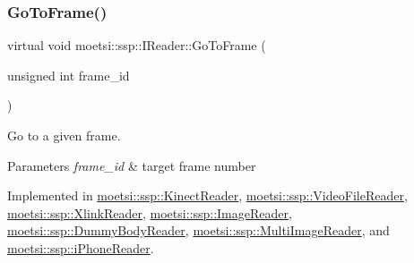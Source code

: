 \mbox{\label{classmoetsi_1_1ssp_1_1IReader_a6f1be3c06538992cca6d550bd9566681}} 
\subsubsection{\texorpdfstring{Go\+To\+Frame()}{GoToFrame()}\hspace{0.1cm}{\footnotesize\ttfamily [1/2]}}
{\footnotesize\ttfamily virtual void moetsi\+::ssp\+::\+I\+Reader\+::\+Go\+To\+Frame (\begin{DoxyParamCaption}\item[{unsigned int}]{frame\+\_\+id }\end{DoxyParamCaption})\hspace{0.3cm}{\ttfamily [pure virtual]}}



Go to a given frame. 


\begin{DoxyParams}{Parameters}
{\em frame\+\_\+id} & target frame number \\
\hline
\end{DoxyParams}


Implemented in \hyperlink{classmoetsi_1_1ssp_1_1KinectReader_a315690c46e153a35d4ded1189e93af08}{moetsi\+::ssp\+::\+Kinect\+Reader}, \hyperlink{classmoetsi_1_1ssp_1_1VideoFileReader_ad98a532db8b1e2c3879df274b2efb082}{moetsi\+::ssp\+::\+Video\+File\+Reader}, \hyperlink{classmoetsi_1_1ssp_1_1XlinkReader_af540d074aeb4d3075db45c246fd48627}{moetsi\+::ssp\+::\+Xlink\+Reader}, \hyperlink{classmoetsi_1_1ssp_1_1ImageReader_a32eb88cc612e6920f4910e0803b0ce3c}{moetsi\+::ssp\+::\+Image\+Reader}, \hyperlink{classmoetsi_1_1ssp_1_1DummyBodyReader_a61e495deb7314560d5e17388f6b6938f}{moetsi\+::ssp\+::\+Dummy\+Body\+Reader}, \hyperlink{classmoetsi_1_1ssp_1_1MultiImageReader_a7c552a1ad469660ea0a88b9ca85138ad}{moetsi\+::ssp\+::\+Multi\+Image\+Reader}, and \hyperlink{classmoetsi_1_1ssp_1_1iPhoneReader_a27b6dea97e4c4db8e4e749cc9e30e7ca}{moetsi\+::ssp\+::i\+Phone\+Reader}.

\mbox{\label{classmoetsi_1_1ssp_1_1IReader_a6f1be3c06538992cca6d550bd9566681}} 
